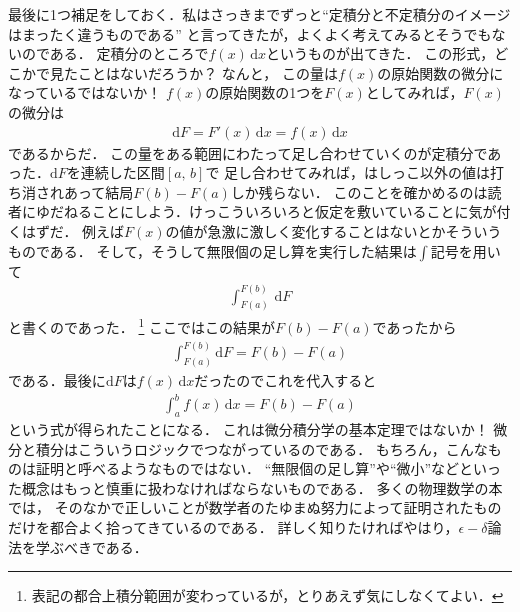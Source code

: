最後に1つ補足をしておく．私はさっきまでずっと``定積分と不定積分のイメージはまったく違うものである''
と言ってきたが，よくよく考えてみるとそうでもないのである．
定積分のところで$f(x) \, \mathrm{d} x$というものが出てきた．
この形式，どこかで見たことはないだろうか？ なんと，
この量は$f(x)$の原始関数の微分になっているではないか！
$f(x)$の原始関数の1つを$F(x)$としてみれば，$F(x)$の微分は
\begin{align*}
\mathrm{d}F = F'(x) \, \mathrm{d}x = f(x) \, \mathrm{d} x
\end{align*}
であるからだ．
この量をある範囲にわたって足し合わせていくのが定積分であった．$\mathrm{d} F$を連続した区間$[ a, \, b ]$で
足し合わせてみれば，はしっこ以外の値は打ち消されあって結局$F(b) - F(a)$しか残らない．
このことを確かめるのは読者にゆだねることにしよう．けっこういろいろと仮定を敷いていることに気が付くはずだ．
例えば$F(x)$の値が急激に激しく変化することはないとかそういうものである．
そして，そうして無限個の足し算を実行した結果は$\int$記号を用いて
\begin{align*}
\int_{F(a)}^{F(b)} \, \mathrm{d} F
\end{align*}
と書くのであった．
\footnote{表記の都合上積分範囲が変わっているが，とりあえず気にしなくてよい．}
ここではこの結果が$F(b)-F(a)$であったから
\begin{align*}
\int_{F(a)}^{F(b)} \mathrm{d}F = F(b) -F(a)
\end{align*}
である．最後に$\mathrm{d}F$は$f(x) \, \mathrm{d} x$だったのでこれを代入すると
\begin{align*}
\int_a^b f(x) \, \mathrm{d}x = F(b) - F(a)
\end{align*}
という式が得られたことになる．
これは微分積分学の基本定理ではないか！ 微分と積分はこういうロジックでつながっているのである．
もちろん，こんなものは証明と呼べるようなものではない．
``無限個の足し算''や``微小''などといった概念はもっと慎重に扱わなければならないものである．
多くの物理数学の本では，
そのなかで正しいことが数学者のたゆまぬ努力によって証明されたものだけを都合よく拾ってきているのである．
詳しく知りたければやはり，$\epsilon - \delta$論法を学ぶべきである．
